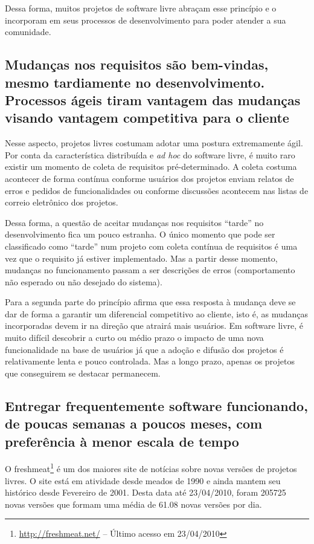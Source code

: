 Dessa forma, muitos projetos de software livre abraçam esse princípio
e o incorporam em seus processos de desenvolvimento para poder atender
a sua comunidade.

\subsection{Mudanças nos requisitos são bem-vindas, mesmo tardiamente
  no desenvolvimento.  Processos ágeis tiram vantagem das mudanças
  visando vantagem competitiva para o cliente}

Nesse aspecto, projetos livres costumam adotar uma postura
extremamente ágil. Por conta da característica distribuída e
\textit{ad hoc} do software livre, é muito raro existir um momento de
coleta de requisitos pré-determinado. A coleta costuma acontecer de
forma contínua conforme usuários dos projetos enviam relatos de erros
e pedidos de funcionalidades ou conforme discussões acontecem nas
listas de correio eletrônico dos projetos.

Dessa forma, a questão de aceitar mudanças nos requisitos ``tarde'' no
desenvolvimento fica um pouco estranha. O único momento que pode ser
classificado como ``tarde'' num projeto com coleta contínua de
requisitos é uma vez que o requisito já estiver implementado. Mas a
partir desse momento, mudanças no funcionamento passam a ser
descrições de erros (comportamento não esperado ou não desejado do
sistema).

Para a segunda parte do princípio afirma que essa resposta à mudança
deve se dar de forma a garantir um diferencial competitivo ao cliente,
isto é, as mudanças incorporadas devem ir na direção que atrairá mais
usuários. Em software livre, é muito difícil descobrir a curto ou
médio prazo o impacto de uma nova funcionalidade na base de usuários
já que a adoção e difusão dos projetos é relativamente lenta e pouco
controlada. Mas a longo prazo, apenas os projetos que conseguirem se
destacar permanecem.

\subsection{Entregar frequentemente software funcionando, de poucas
  semanas a poucos meses, com preferência à menor escala de tempo}


O freshmeat\footnote{\url{http://freshmeat.net/} -- Último acesso em
  23/04/2010} é um dos maiores site de notícias sobre novas versões de
projetos livres. O site está em atividade desde meados de 1990 e ainda
mantem seu histórico desde Fevereiro de 2001. Desta data até
23/04/2010, foram 205725 novas versões que formam uma média de 61.08
novas versões por dia.

